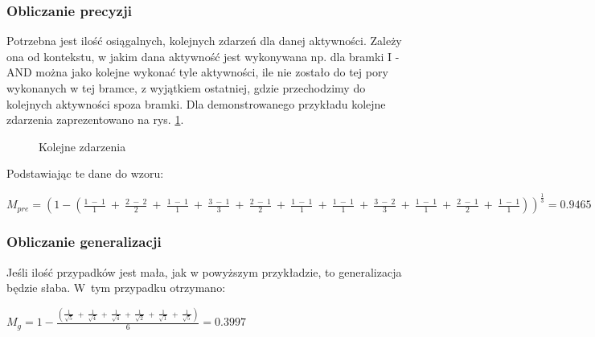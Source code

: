 \subsubsection{Obliczanie precyzji}
Potrzebna jest ilość osiągalnych, kolejnych zdarzeń dla danej aktywności. Zależy ona od kontekstu, w jakim dana aktywność jest wykonywana np. dla bramki I - AND można jako kolejne wykonać tyle aktywności, ile nie zostało do tej pory wykonanych w tej bramce, z wyjątkiem ostatniej, gdzie przechodzimy do kolejnych aktywności spoza bramki. Dla demonstrowanego przykładu kolejne zdarzenia zaprezentowano na rys. \ref{fig:directly-follows}.
\begin{figure}[H]
	\caption{\label{fig:directly-follows}Kolejne zdarzenia}
\end{figure}
Podstawiając te dane do wzoru:
\begin{center}
$M_{pre} = (1 - (\frac{1\ -\ 1}{1}\ +\ \frac{2\ -\ 2}{2}\ +\ \frac{1\ -\ 1}{1}\ +\ \frac{3\ -\ 1}{3}\ +\ \frac{2\ -\ 1}{2}\ +\ \frac{1\ -\ 1}{1}\ +\ \frac{1\ -\ 1}{1}\ +\ \frac{3\ -\ 2}{3}\ +\ \frac{1\ -\ 1}{1}\ +\ \frac{2\ -\ 1}{2}\ +\ \frac{1\ -\ 1}{1}))^{\frac{1}{3}} = 0.9465 $
\end{center}

\subsubsection{Obliczanie generalizacji}
Jeśli ilość przypadków jest mała, jak w powyższym przykładzie, to generalizacja będzie słaba. W~tym przypadku otrzymano:
\begin{center}
$M_g = 1 - \frac{(\frac{1}{\sqrt{5}}\ +\ \frac{1}{\sqrt{4}}\ +\ \frac{1}{\sqrt{4}}\ +\ \frac{1}{\sqrt{2}}\ +\ \frac{1}{\sqrt{1}}\ +\ \frac{1}{\sqrt{5}})}{6} = 0.3997$
\end{center}


